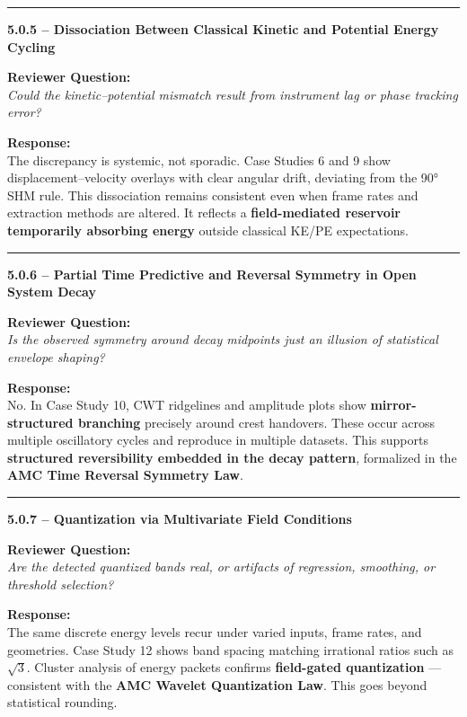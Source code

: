 \documentclass[10pt,aps,pre,onecolumn,superscriptaddress,notitlepage]{revtex4-2}
\begin{document}
\vspace{1em}
\hrule
\vspace{1em}

\textbf{5.0.5 – Dissociation Between Classical Kinetic and Potential Energy Cycling}

\textbf{Reviewer Question:} \\
\textit{Could the kinetic–potential mismatch result from instrument lag or phase tracking error?}

\textbf{Response:} \\
The discrepancy is systemic, not sporadic. Case Studies 6 and 9 show displacement–velocity overlays with clear angular drift, deviating from the 90° SHM rule. This dissociation remains consistent even when frame rates and extraction methods are altered. It reflects a \textbf{field-mediated reservoir temporarily absorbing energy} outside classical KE/PE expectations.

\vspace{1em}
\hrule
\vspace{1em}

\textbf{5.0.6 – Partial Time Predictive and Reversal Symmetry in Open System Decay}

\textbf{Reviewer Question:} \\
\textit{Is the observed symmetry around decay midpoints just an illusion of statistical envelope shaping?}

\textbf{Response:} \\
No. In Case Study 10, CWT ridgelines and amplitude plots show \textbf{mirror-structured branching} precisely around crest handovers. These occur across multiple oscillatory cycles and reproduce in multiple datasets. This supports \textbf{structured reversibility embedded in the decay pattern}, formalized in the \textbf{AMC Time Reversal Symmetry Law}.

\vspace{1em}
\hrule
\vspace{1em}

\textbf{5.0.7 – Quantization via Multivariate Field Conditions}

\textbf{Reviewer Question:} \\
\textit{Are the detected quantized bands real, or artifacts of regression, smoothing, or threshold selection?}

\textbf{Response:} \\
The same discrete energy levels recur under varied inputs, frame rates, and geometries. Case Study 12 shows band spacing matching irrational ratios such as $\sqrt{3}$. Cluster analysis of energy packets confirms \textbf{field-gated quantization} — consistent with the \textbf{AMC Wavelet Quantization Law}. This goes beyond statistical rounding.
\end{document}
